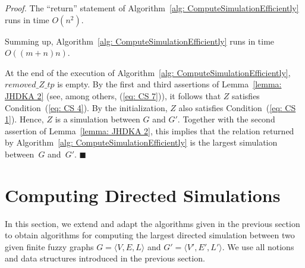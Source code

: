 \documentclass[11pt]{article}
\def\tuple#1{\langle#1\rangle}
\def\eqref#1{(\ref{#1})}
\newcommand{\myend}{\mbox{}\hfill{\footnotesize$\blacksquare$}}
\newcommand{\removeZ}{\textit{removed\_Z\_tp}}
\newenvironment{proof}{
	
	\smallskip
	
	\noindent
	{\em Proof.}}{
	
	\smallskip
	
}
\begin{document}
\begin{proof}
The ``return'' statement of Algorithm~\ref{alg: ComputeSimulationEfficiently} runs in time $O(n^2)$. 

Summing up, Algorithm~\ref{alg: ComputeSimulationEfficiently} runs in time $O((m+n)n)$.   

At the end of the execution of Algorithm~\ref{alg: ComputeSimulationEfficiently}, $\removeZ$ is empty. 
By the first and third assertions of Lemma~\ref{lemma: JHDKA 2} (see, among others, \eqref{eq: CS 7}), it follows that $Z$ satisfies Condition~\eqref{eq: CS 4}. By the initialization, $Z$ also satisfies Condition~\eqref{eq: CS 1}. Hence, $Z$ is a simulation between $G$ and $G'$. Together with the second assertion of Lemma~\ref{lemma: JHDKA 2}, this implies that the relation returned by Algorithm~\ref{alg: ComputeSimulationEfficiently} is the largest simulation between~$G$ and~$G'$.
\myend
\end{proof}


\section{Computing Directed Simulations}
\label{section: comp-CDS}

In this section, we extend and adapt the algorithms given in the previous section to obtain algorithms for computing the largest directed simulation between two given finite fuzzy graphs $G = \tuple{V, E, L}$ and $G' = \tuple{V', E', L'}$. 
%
We use all notions and data structures introduced in the previous section. 
\end{document}
